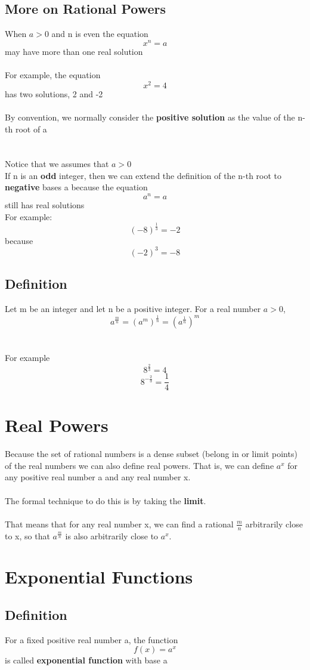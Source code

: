 \documentclass{article}[18pt]
\begin{document}
\subsection{More on Rational Powers}
When $a>0$ and n is even the equation
$$x^n=a$$
may have more than one real solution\\
\\
For example, the equation 
$$x^2=4$$
has two solutions, 2 and -2\\
\\
By convention, we normally consider the \textbf{positive solution} as the value of the n-th root of a\\
\\
\\
Notice that we assumes that $a>0$\\
If n is an \textbf{odd} integer, then we can extend the definition of the n-th root to \textbf{negative} bases a because the equation
$$a^n=a$$
still has real solutions\\
For example:
$$(-8)^{\frac{1}{3}}=-2$$
because
$$(-2)^3=-8$$
\subsection{Definition}
Let m be an integer and let n be a positive integer. For a real number $a>0$,
{\Large$$a^{\frac{m}{n}}=(a^m)^\frac{1}{n}=(a^\frac{1}{n})^m$$}
$ $\\
\\
For example
{\large$$8^\frac{2}{3}=4$$
$$8^{-\frac{2}{3}}=\frac{1}{4}$$}
\section{Real Powers}
Because the set of rational numbers is a dense subset (belong in or limit points) of the real numbers we can also define real powers. That is, we can define $a^x$ for any positive real number a and any real number x.\\
\\
The formal technique to do this is by taking the \textbf{limit}.\\
\\
That means that for any real number x, we can find a rational $\frac{m}{n}$ arbitrarily close to x, so that $a^{\frac{m}{n}}$ is also arbitrarily close to $a^x$.
\section{Exponential Functions}
\subsection{Definition}
For a fixed positive real number a, the function
$$f(x)=a^x$$
is called \textbf{exponential function} with base a
\end{document}
